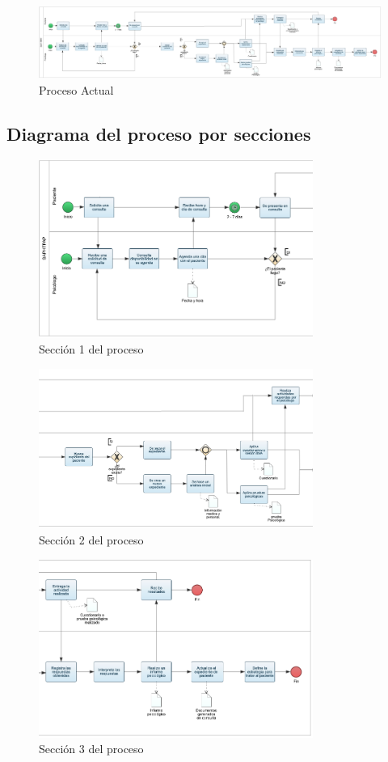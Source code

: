 \begin{figure}[H]
\centering
\includegraphics[width=\textwidth]{imagenes/PFinal}
\caption{Proceso Actual}
\label{img:proces1}
\end{figure}
\newpage
\subsection{Diagrama del proceso por secciones}

\begin{figure}[H]
\centering
\includegraphics[width=0.8\textwidth]{imagenes/PFinal_1}
\caption{Sección 1 del proceso}
\label{img:proces1_1}
\end{figure}

\begin{figure}[H]
\centering
\includegraphics[width=0.8\textwidth]{imagenes/PFinal_2}
\caption{Sección 2 del proceso}
\label{img:proces1_2}
\end{figure}

\begin{figure}[H]
\centering
\includegraphics[width=0.8\textwidth]{imagenes/PFinal_3}
\caption{Sección 3 del proceso}
\label{img:proces1_3}
\end{figure}

\newpage